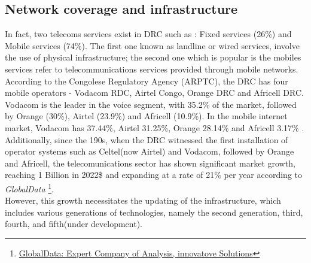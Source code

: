 \documentclass[12pt,a4paper, oneside]{book}
\begin{document}
	   \subsection{Network coverage and infrastructure}   
	    In fact, two telecoms services exist in DRC such as : Fixed services (26\%) and Mobile services (74\%). The first one known as landline or wired services, involve the use of physical infrastructure; the second one which is popular is the mobiles services refer to telecommunications services provided through mobile networks.
	    According to the Congolese Regulatory Agency (ARPTC), the DRC has four mobile operators - Vodacom RDC,
	    Airtel Congo, Orange DRC and Africell DRC. Vodacom is the leader in the voice segment, with 35.2\% of the market,
	    followed by Orange (30\%), Airtel (23.9\%) and Africell (10.9\%). In the mobile internet market, Vodacom has 37.44\%, Airtel
	    31.25\%, Orange 28.14\% and Africell 3.17\% \cite{stateInternet2019}. \\
	     	     	        
	   Additionally, since the 190s, when the DRC witnessed the first installation of operator systems such as Celtel(now Airtel) and Vodacom, followed by Orange and Africell, the telecomunications sector has shown significant market growth, reaching 1 Billion in 2022\$ and expanding at a rate of 21\% per year according to  \textit{GlobalData} \footnote{\href{https://www.globaldata.com/store/report/drc-telecom-operators-market-analysis/}{GlobalData: Expert Company of Analysis, innovatove Solutions}}. \\
	   
	   However, this growth necessitates the updating of the infrastructure, which includes various generations of technologies, namely the second generation, third, fourth, and fifth(under development).\\
	   	   
\end{document}
